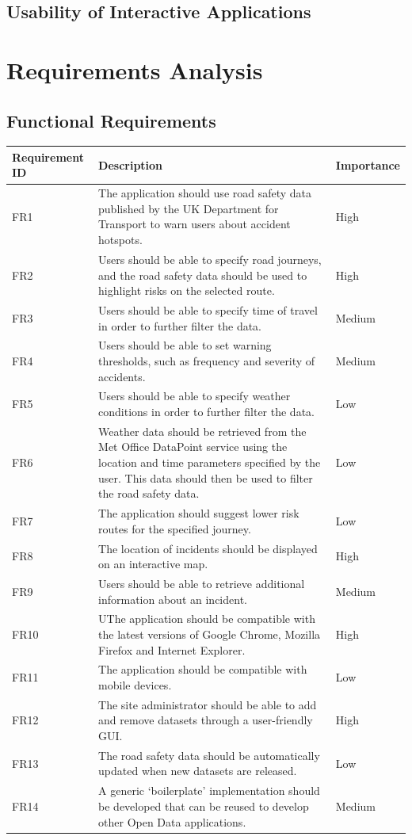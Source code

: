 \documentclass[authoryearcitations]{UoYCSproject}
\begin{document}
\section{Usability of Interactive Applications}

\chapter{Requirements Analysis}

\section{Functional Requirements}

\begin{tabular}{| p{2.2cm} | p{7.5cm} | p{2cm} |}
	\hline
	\textbf{Requirement ID} & \textbf{Description} & \textbf{Importance} \\ \hline
	FR1 & The application should use road safety data published by the UK Department for Transport to warn users about accident hotspots. & High \\ \hline
	FR2 & Users should be able to specify road journeys, and the road safety data should be used to highlight risks on the selected route. & High \\ \hline
	FR3 & Users should be able to specify time of travel in order to further filter the data. & Medium \\ \hline
	FR4 & Users should be able to set warning thresholds, such as frequency and severity of accidents. & Medium \\ \hline
	FR5 & Users should be able to specify weather conditions in order to further filter the data. & Low \\ \hline
	FR6 & Weather data should be retrieved from the Met Office DataPoint service using the location and time parameters specified by the user. This data should then be used to filter the road safety data. & Low \\ \hline
	FR7 & The application should suggest lower risk routes for the specified journey. & Low \\ \hline
	FR8 & The location of incidents should be displayed on an interactive map. & High \\ \hline
	FR9 & Users should be able to retrieve additional information about an incident. & Medium \\ \hline
	FR10 & UThe application should be compatible with the latest versions of Google Chrome, Mozilla Firefox and Internet Explorer. & High \\ \hline
	FR11 & The application should be compatible with mobile devices. & Low \\ \hline
	FR12 & The site administrator should be able to add and remove datasets through a user-friendly GUI. & High \\ \hline
	FR13 & The road safety data should be automatically updated when new datasets are released. & Low \\ \hline
	FR14 & A generic ‘boilerplate’ implementation should be developed that can be reused to develop other Open Data applications. & Medium \\
	\hline
\end{tabular}
\end{document}
